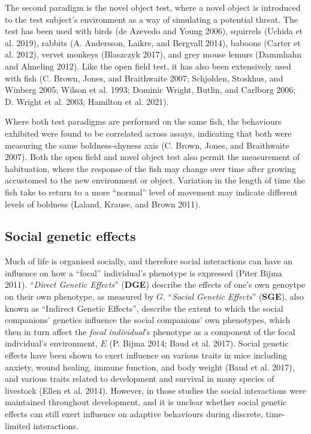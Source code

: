 \documentclass[
]{book}
\begin{document}
The second paradigm is the novel object test, where a novel object is introduced to the test subject's environment as a way of simulating a potential threat. The test has been used with birds (de Azevedo and Young 2006), squirrels (Uchida et al. 2019), rabbits (A. Andersson, Laikre, and Bergvall 2014), baboons (Carter et al. 2012), vervet monkeys (Blaszczyk 2017), and grey mouse lemurs (Dammhahn and Almeling 2012). Like the open field test, it has also been extensively used with fish (C. Brown, Jones, and Braithwaite 2007; Schjolden, Stoskhus, and Winberg 2005; Wilson et al. 1993; Dominic Wright, Butlin, and Carlborg 2006; D. Wright et al. 2003; Hamilton et al. 2021).

Where both test paradigms are performed on the same fish, the behaviours exhibited were found to be correlated across assays, indicating that both were measuring the same boldness-shyness axis (C. Brown, Jones, and Braithwaite 2007). Both the open field and novel object test also permit the measurement of habituation, where the response of the fish may change over time after growing accustomed to the new environment or object. Variation in the length of time the fish take to return to a more ``normal'' level of movement may indicate different levels of boldness (Laland, Krause, and Brown 2011).

\hypertarget{SGE}{%
\subsection{Social genetic effects}\label{SGE}}

Much of life is organised socially, and therefore social interactions can have an influence on how a ``focal'' individual's phenotype is expressed (Piter Bijma 2011). ``\emph{Direct Genetic Effects}'' (\textbf{DGE}) describe the effects of one's own genoytpe on their own phenotype, as measured by \(G\). ``\emph{Social Genetic Effects}'' (\textbf{SGE}), also known as ``Indirect Genetic Effects'', describe the extent to which the social companions' genetics influence the social companions' own phenotypes, which then in turn affect the \emph{focal individual}'s phenotype as a component of the focal individual's environment, \(E\) (P. Bijma 2014; Baud et al. 2017). Social genetic effects have been shown to exert influence on various traits in mice including anxiety, wound healing, immune function, and body weight (Baud et al. 2017), and various traits related to development and survival in many species of livestock (Ellen et al. 2014). However, in those studies the social interactions were maintained throughout development, and it is unclear whether social genetic effects can still exert influence on adaptive behaviours during discrete, time-limited interactions.
\end{document}
